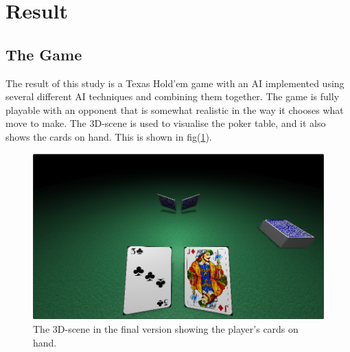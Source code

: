 \documentclass[journal]{vgtc}                %
\begin{document}
\section{Result}
\subsection{The Game}
The result of this study is a Texas Hold'em game with an AI implemented using several different AI techniques and combining them together. The game is fully playable with an opponent that is somewhat realistic in the way it chooses what move to make. The 3D-scene is used to visualise the poker table, and it also shows the cards on hand. This is shown in fig(\ref{fig:3dscene}).
\begin{figure}[here]
  \begin{center}
    \includegraphics[scale=0.30]{img/3dscene.png}
    \caption{\label{fig:3dscene} The 3D-scene in the final version showing the player's cards on hand.}
  \end{center}
\end{figure}
\end{document}
